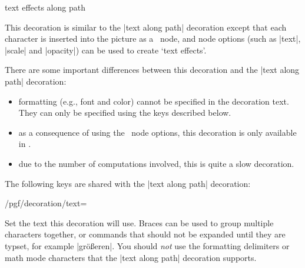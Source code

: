 \begin{decoration}{text effects along path}

  This decoration is similar to the |text along path| decoration
  except that each character is inserted into the picture
  as a \tikzname\ node, and node options (such as |text|, |scale| and |opacity|)
  can be used to create `text effects'.

\begin{codeexample}[]
\bfseries\large
{}
\end{codeexample}


  There are some important differences between this decoration and the
  |text along path| decoration:
  
  \begin{itemize}
  \item 
    formatting (e.g., font and color)
  	cannot be specified in the decoration text. They can only be specified
  	using the keys described below.  	
 	\item
 	  as a consequence of using the \tikzname\ node options, this
  	decoration is only available in \tikzname.
  \item
  	due to the number of computations involved, this is
  	quite a slow decoration.
  	
  \end{itemize}
 
  The following keys are shared with the |text along path|
  decoration:
  
\begin{key}{/pgf/decoration/text=}


  Set the text this decoration will use. Braces can be
  used to group multiple characters together, 
  or commands that should not be expanded until they are typset, for example
  |gr{\"o}{\ss}eren|. You should \emph{not} use the formatting 
  delimiters or math mode characters 
  that the |text along path| decoration  supports.
  

\end{key}
\end{decoration}
